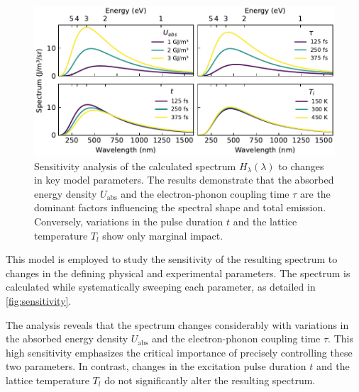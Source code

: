 \documentclass[
	a4paper,
]{scrarticle}
\begin{document}
\begin{figure}
    \centering
    \includegraphics{../analysis/figures/sensitivity.pdf}
    \caption{Sensitivity analysis of the calculated spectrum $H_\lambda(\lambda)$ to changes in key model parameters. The results demonstrate that the absorbed energy density $U_{\text{abs}}$ and the electron-phonon coupling time $\tau$ are the dominant factors influencing the spectral shape and total emission. Conversely, variations in the pulse duration $t$ and the lattice temperature $T_l$ show only marginal impact.}
    \label{fig:sensitivity}
\end{figure}
This model is employed to study the sensitivity of the resulting spectrum to changes in the defining physical and experimental parameters. The spectrum is calculated while systematically sweeping each parameter, as detailed in \autoref{fig:sensitivity}.

The analysis reveals that the spectrum changes considerably with variations in the absorbed energy density $U_{\text{abs}}$ and the electron-phonon coupling time $\tau$. This high sensitivity emphasizes the critical importance of precisely controlling these two parameters. In contrast, changes in the excitation pulse duration $t$ and the lattice temperature $T_l$ do not significantly alter the resulting spectrum.
\end{document}
